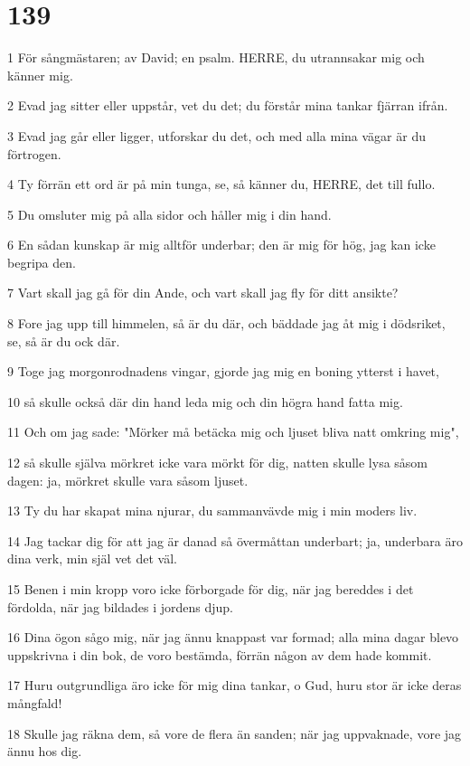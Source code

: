 \chapter{139}

\par 1 För sångmästaren; av David; en psalm. HERRE, du utrannsakar mig och känner mig.
\par 2 Evad jag sitter eller uppstår, vet du det; du förstår mina tankar fjärran ifrån.
\par 3 Evad jag går eller ligger, utforskar du det, och med alla mina vägar är du förtrogen.
\par 4 Ty förrän ett ord är på min tunga, se, så känner du, HERRE, det till fullo.
\par 5 Du omsluter mig på alla sidor och håller mig i din hand.
\par 6 En sådan kunskap är mig alltför underbar; den är mig för hög, jag kan icke begripa den.
\par 7 Vart skall jag gå för din Ande, och vart skall jag fly för ditt ansikte?
\par 8 Fore jag upp till himmelen, så är du där, och bäddade jag åt mig i dödsriket, se, så är du ock där.
\par 9 Toge jag morgonrodnadens vingar, gjorde jag mig en boning ytterst i havet,
\par 10 så skulle också där din hand leda mig och din högra hand fatta mig.
\par 11 Och om jag sade: "Mörker må betäcka mig och ljuset bliva natt omkring mig",
\par 12 så skulle själva mörkret icke vara mörkt för dig, natten skulle lysa såsom dagen: ja, mörkret skulle vara såsom ljuset.
\par 13 Ty du har skapat mina njurar, du sammanvävde mig i min moders liv.
\par 14 Jag tackar dig för att jag är danad så övermåttan underbart; ja, underbara äro dina verk, min själ vet det väl.
\par 15 Benen i min kropp voro icke förborgade för dig, när jag bereddes i det fördolda, när jag bildades i jordens djup.
\par 16 Dina ögon sågo mig, när jag ännu knappast var formad; alla mina dagar blevo uppskrivna i din bok, de voro bestämda, förrän någon av dem hade kommit.
\par 17 Huru outgrundliga äro icke för mig dina tankar, o Gud, huru stor är icke deras mångfald!
\par 18 Skulle jag räkna dem, så vore de flera än sanden; när jag uppvaknade, vore jag ännu hos dig.
